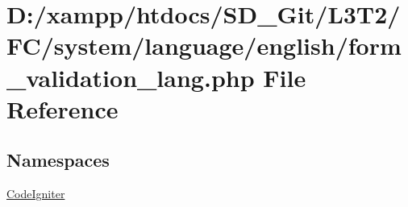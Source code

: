 \hypertarget{system_2language_2english_2form__validation__lang_8php}{}\section{D\+:/xampp/htdocs/\+S\+D\+\_\+\+Git/\+L3\+T2/\+F\+C/system/language/english/form\+\_\+validation\+\_\+lang.php File Reference}
\label{system_2language_2english_2form__validation__lang_8php}
\subsection*{Namespaces}
\begin{DoxyCompactItemize}
\item 
 \hyperlink{namespace_code_igniter}{Code\+Igniter}
\end{DoxyCompactItemize}
